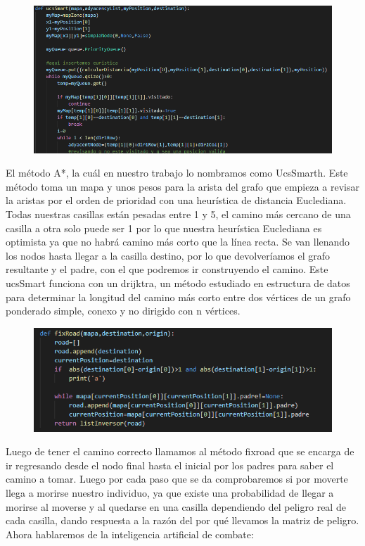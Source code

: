 \documentclass{llncs}
\begin{document}
\begin{figure}
	\centering
	\includegraphics[width=0.7\linewidth]{imagenesMisc/UcsSmart}
	\caption{}
	\label{fig:ucssmart}
\end{figure}

El método A*, la cuál en nuestro trabajo lo nombramos como UcsSmarth. Este método toma un mapa y unos pesos para la arista del grafo que empieza a revisar la aristas por el orden de prioridad con una heurística de distancia Euclediana. Todas nuestras casillas están pesadas entre 1 y 5, el camino más cercano de una casilla a otra solo puede ser 1 por lo que nuestra heurística Euclediana es optimista ya que no habrá camino más corto que la línea recta.
\newline
\newline
Se van llenando los nodos hasta llegar a la casilla destino, por lo que devolveríamos el grafo resultante y el padre, con el que podremos ir construyendo el camino.
\newline
\newline
Este ucsSmart funciona con un drijktra, un método estudiado en estructura de datos para determinar la longitud del camino más corto entre dos vértices de un grafo ponderado simple, conexo y no dirigido con n vértices.

\begin{figure}
	\centering
	\includegraphics[width=0.7\linewidth]{imagenesMisc/FixRoad}
	\label{fig:fixroad}
\end{figure}

Luego de tener el camino correcto llamamos al método fixroad que se encarga de ir regresando desde el nodo final hasta el inicial por los padres para saber el camino a tomar.
\newline
\newline
Luego por cada paso que se da comprobaremos si por moverte llega a morirse nuestro individuo, ya que existe una probabilidad de llegar a morirse al moverse y al quedarse en una casilla dependiendo del peligro real de cada casilla, dando respuesta a la razón del por qué llevamos la matriz de peligro. 
\newline
\newline
Ahora hablaremos de la inteligencia artificial de combate:
\end{document}
